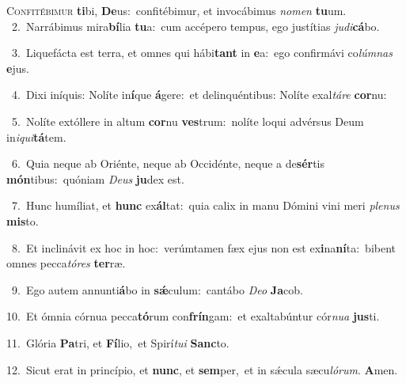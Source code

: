 \lettrine{\initial\textcolor{\initialcolor}{C}}{onfitébimur} \textbf{ti}\-bi, \textbf{De}\-us:~\star confitébimur, et invocábimus \textit{no}\-\textit{men} \textbf{tu}\-um.\\
{\numbfont\textcolor{\numbcolor}{~2.}}~Narrábimus mira\-\textbf{bí}\-lia \textbf{tu}\-a:~\star cum accépero tempus, ego justítias \textit{ju}\-\textit{di}\textbf{cá}bo.\par
{\numbfont\textcolor{\numbcolor}{~3.}}~Liquefácta est terra, et omnes qui hábi\textbf{tant} in \textbf{e}\-a:~\star ego confirmávi co\-\textit{lúm}\-\textit{nas} \textbf{e}\-jus.\par
{\numbfont\textcolor{\numbcolor}{~4.}}~Dixi iníquis: Nolíte in\-\textbf{í}\-que \textbf{á}\-gere:~\star et delinquéntibus: Nolíte exal\-\textit{tá}\-\textit{re} \textbf{cor}\-nu:\par
{\numbfont\textcolor{\numbcolor}{~5.}}~Nolíte extóllere in altum \textbf{cor}\-nu \textbf{ves}\-trum:~\star nolíte loqui advérsus Deum in\-\textit{i}\-\textit{qui}\textbf{tá}tem.\par
{\numbfont\textcolor{\numbcolor}{~6.}}~Quia neque ab Oriénte, neque ab Occidénte, neque a de\-\textbf{sér}\-tis \textbf{món}\-tibus:~\star quóniam \textit{De}\-\textit{us} \textbf{ju}\-dex est.\par
{\numbfont\textcolor{\numbcolor}{~7.}}~Hunc humíliat, et \textbf{hunc} ex\-\textbf{ál}\-tat:~\star quia calix in manu Dómini vini meri \textit{ple}\-\textit{nus} \textbf{mis}\-to.\par
{\numbfont\textcolor{\numbcolor}{~8.}}~Et inclinávit ex hoc in hoc:~\dagger verúmtamen fæx ejus non est ex\-\textbf{i}\-na\-\textbf{ní}\-ta:~\star bibent omnes pecca\-\textit{tó}\-\textit{res} \textbf{ter}\-ræ.\par
{\numbfont\textcolor{\numbcolor}{~9.}}~Ego autem annunti\-\textbf{á}\-bo in \textbf{sǽ}\-culum:~\star cantábo \textit{De}\-\textit{o} \textbf{Ja}\-cob.\par
{\numbfont\textcolor{\numbcolor}{10.}}~Et ómnia córnua pecca\-\textbf{tó}\-rum con\-\textbf{frín}\-gam:~\star et exaltabúntur cór\-\textit{nu}\-\textit{a} \textbf{jus}\-ti.\par
{\numbfont\textcolor{\numbcolor}{11.}}~Glória \textbf{Pa}\-tri, et \textbf{Fí}\-lio,~\star et Spirí\-\textit{tu}\-\textit{i} \textbf{Sanc}\-to.\par
{\numbfont\textcolor{\numbcolor}{12.}}~Sicut erat in princípio, et \textbf{nunc}\-, et \textbf{sem}\-per,~\star et in sǽcula sæcu\-\textit{ló}\-\textit{rum}. \textbf{A}\-men.\par
